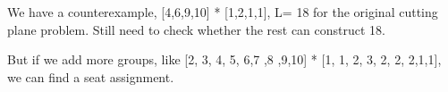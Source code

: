 




We have a counterexample, [4,6,9,10] * [1,2,1,1], L= 18 for the original cutting plane problem. Still need to check whether the rest can construct 18.

But if we add more groups, like [2, 3, 4, 5, 6,7 ,8 ,9,10] * [1, 1, 2, 3, 2, 2, 2,1,1], we can find a seat assignment.

%
%

